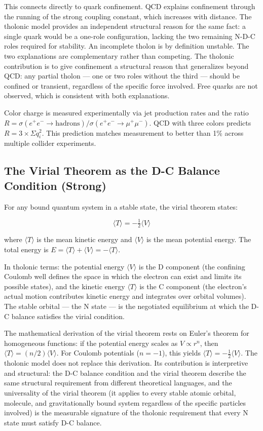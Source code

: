 \documentclass[12pt]{article}
\begin{document}
This connects directly to quark confinement. QCD explains confinement
through the running of the strong coupling constant, which increases
with distance. The tholonic model provides an independent structural
reason for the same fact: a single quark would be a one-role
configuration, lacking the two remaining N-D-C roles required for
stability. An incomplete tholon is by definition unstable. The two
explanations are complementary rather than competing. The tholonic
contribution is to give confinement a structural reason that generalizes
beyond QCD: any partial tholon --- one or two roles without the third
--- should be confined or transient, regardless of the specific force
involved. Free quarks are not observed, which is consistent with both
explanations.

Color charge is measured experimentally via jet production rates and the
ratio
\(R = \sigma(e^+e^- \to \text{hadrons}) / \sigma(e^+e^- \to \mu^+\mu^-)\).
QCD with three colors predicts \(R = 3 \times \Sigma q_i^2\). This
prediction matches measurement to better than 1\% across multiple
collider experiments.

\subsection{The Virial Theorem as the D-C Balance Condition (Strong)}\label{the-virial-theorem-as-the-d-c-balance-condition-strong}

For any bound quantum system in a stable state, the virial theorem
states:

\[\langle T \rangle = -\tfrac{1}{2}\langle V \rangle\]

where \(\langle T \rangle\) is the mean kinetic energy and
\(\langle V \rangle\) is the mean potential energy. The total energy is
\(E = \langle T \rangle + \langle V \rangle = -\langle T \rangle\).

In tholonic terms: the potential energy \(\langle V \rangle\) is the D
component (the confining Coulomb well defines the space in which the
electron can exist and limits its possible states), and the kinetic
energy \(\langle T \rangle\) is the C component (the electron's actual
motion contributes kinetic energy and integrates over orbital volumes).
The stable orbital --- the N state --- is the negotiated equilibrium at
which the D-C balance satisfies the virial condition.

The mathematical derivation of the virial theorem rests on Euler's
theorem for homogeneous functions: if the potential energy scales as
\(V \propto r^n\), then \(\langle T \rangle = (n/2)\langle V \rangle\).
For Coulomb potentials (\(n = -1\)), this yields
\(\langle T \rangle = -\tfrac{1}{2}\langle V \rangle\). The tholonic
model does not replace this derivation. Its contribution is interpretive
and structural: the D-C balance condition and the virial theorem
describe the same structural requirement from different theoretical
languages, and the universality of the virial theorem (it applies to
every stable atomic orbital, molecule, and gravitationally bound system
regardless of the specific particles involved) is the measurable
signature of the tholonic requirement that every N state must satisfy
D-C balance.
\end{document}
